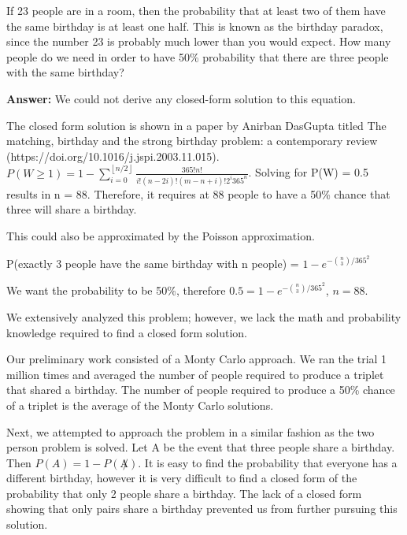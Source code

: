 \documentclass{article}
\author{Group 13: Elliott Pryor, Ben Bushnell, Shengnan Zhou}
\date{due: 18 October 2019}
\begin{document}
\nextprob
If 23 people are in a room, then the probability that at least two of them have
the same birthday is at least one half.  This is known as the birthday paradox,
since the number 23 is probably much lower than you would expect.  How many
people do we need in order to have 50\% probability that there are three people
with the same birthday?


\textbf{Answer: } We could not derive any closed-form solution to this equation. 

The closed form solution is shown in a paper by Anirban DasGupta titled The matching, birthday and the strong birthday problem: a contemporary review (https://doi.org/10.1016/j.jspi.2003.11.015). $P(W \geq 1) = 1 - \sum_{i=0}^{\left \lfloor{n/2}\right \rfloor } \frac{365!n!}{i!(n-2i)!(m-n+i)!2^i365^n}$. Solving for P(W) = 0.5 results in n = 88. Therefore, it requires at 88 people to have a 50\% chance that three will share a birthday. 

This could also be approximated by the Poisson approximation. 

P(exactly 3 people have the same birthday with n people) = $1 - e^{-{n\choose 3}/365^2}$

We want the probability to be 50\%, therefore $0.5 = 1 - e^{-{n\choose 3}/365^2}$, $n = 88$.

We extensively analyzed this problem; however, we lack the math and probability knowledge required to find a closed form solution. 

Our preliminary work consisted of a Monty Carlo approach. We ran the trial 1 million times and averaged the number of people required to produce a triplet that shared a birthday. The number of people required to produce a 50\% chance of a triplet is the average of the Monty Carlo solutions. 

Next, we attempted to approach the problem in a similar fashion as the two person problem is solved. Let A be the event that three people share a birthday. Then $P(A) = 1 - P(\not A)$. It is easy to find the probability that everyone has a different birthday, however it is very difficult to find a closed form of the probability that only 2 people share a birthday. The lack of a closed form showing that only pairs share a birthday prevented us from further pursuing this solution.
\end{document}
